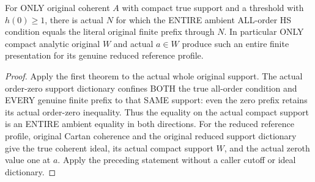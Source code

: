\begin{theorem}
\label{hir:actual-original-compact-support-whole-ambient-finite-hs-prefix}
\leanok
For ONLY original coherent $A$ with compact true support and a threshold
with $h(0)\ge1$, there is actual $N$ for which the ENTIRE ambient ALL-order
HS condition equals the literal original finite prefix through $N$.
In particular ONLY compact analytic original $W$ and actual $a\in W$
produce such an entire finite presentation for its genuine reduced
reference profile.
\end{theorem}
\begin{proof}
Apply the first theorem to the actual whole original support. The actual
order-zero support dictionary confines BOTH the true all-order condition
and EVERY genuine finite prefix to that SAME support: even the zero
prefix retains its actual order-zero inequality. Thus the equality on
the actual compact support is an ENTIRE ambient equality in both
directions. For the reduced reference profile, original Cartan coherence
and the original reduced support dictionary give the true coherent ideal,
its actual compact support $W$, and the actual zeroth value one at $a$.
Apply the preceding statement without a caller cutoff or ideal dictionary.
\end{proof}

